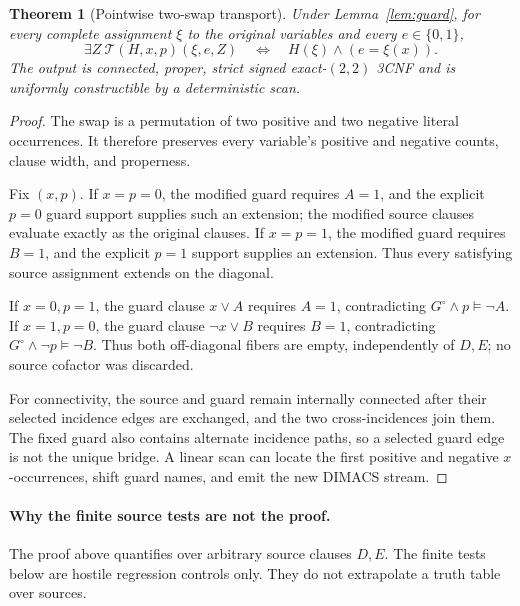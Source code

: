 \documentclass[11pt]{article}
\newtheorem{theorem}{Theorem}
\begin{document}
\begin{theorem}[Pointwise two-swap transport]\label{thm:transport}
Under Lemma~\ref{lem:guard}, for every complete assignment \(\xi\) to
the original variables and every \(e\in\{0,1\}\),
\[
 \exists Z\ \mathcal T(H,x,p)(\xi,e,Z)
 \quad\Longleftrightarrow\quad
 H(\xi)\wedge(e=\xi(x)).
\]
The output is connected, proper, strict signed exact-$(2,2)$ 3CNF and is
uniformly constructible by a deterministic scan.
\end{theorem}
\begin{proof}
The swap is a permutation of two positive and two negative literal
occurrences.  It therefore preserves every variable's positive and negative
counts, clause width, and properness.

Fix \((x,p)\).  If \(x=p=0\), the modified guard requires \(A=1\), and the
explicit \(p=0\) guard support supplies such an extension; the modified
source clauses evaluate exactly as the original clauses.  If \(x=p=1\),
the modified guard requires \(B=1\), and the explicit \(p=1\) support
supplies an extension.  Thus every satisfying source assignment extends on
the diagonal.

If \(x=0,p=1\), the guard clause \(x\vee A\) requires \(A=1\), contradicting
\(G^\circ\wedge p\models\neg A\).  If \(x=1,p=0\), the guard clause
\(\neg x\vee B\) requires \(B=1\), contradicting
\(G^\circ\wedge\neg p\models\neg B\).  Thus both off-diagonal fibers are
empty, independently of \(D,E\); no source cofactor was discarded.

For connectivity, the source and guard remain internally connected after
their selected incidence edges are exchanged, and the two cross-incidences
join them.  The fixed guard also contains alternate incidence paths, so a
selected guard edge is not the unique bridge.  A linear scan can locate the
first positive and negative \(x\)-occurrences, shift guard names, and emit the
new DIMACS stream.
\end{proof}

\paragraph{Why the finite source tests are not the proof.}
The proof above quantifies over arbitrary source clauses \(D,E\).  The finite
tests below are hostile regression controls only.  They do not extrapolate a
truth table over sources.
\end{document}
